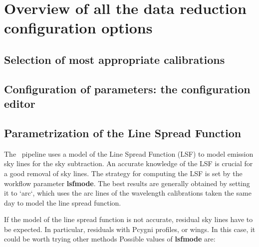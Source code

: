 \section{Overview of all the data reduction configuration options}
\label{sec:configuretion_overview}

\subsection{Selection of most appropriate calibrations}



\subsection{Configuration of parameters: the configuration editor}
\label{sec:configuration_editor}




\subsection{Parametrization of the Line Spread Function}
\label{sec:configuration_lsf}

The \instname\ pipeline uses a model of the Line Spread Function (LSF)
to model emission sky lines for the sky subtraction.  An accurate
knowledge of the LSF is crucial for a good removal of sky lines. The
strategy for computing the LSF is set by the workflow parameter
{\bf lsfmode}.  The best results are generally obtained by setting it
to `arc`, which uses the arc lines of the wavelength calibrations
taken the same day to model the line spread function.

If the model of the line spread function is not accurate, residual sky
lines have to be expected. In particular, residuals with Pcygni
profiles, or wings. In this case, it could be worth trying other
methods Possible values of {\bf lsfmode} are:

